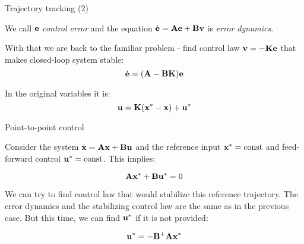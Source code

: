 \documentclass{beamer}
\begin{document}
\begin{frame}{Trajectory tracking (2)}
	\begin{flushleft}
		
		We call $\mathbf{e}$ \emph{control error} and the equation $\dot{\mathbf{e}} = \mathbf{A}\mathbf{e} + \mathbf{B}\mathbf{v}$ is \emph{error dynamics}.
		
		\bigskip
		
		With that we are back to the familiar problem - find control law $\mathbf{v} = -\mathbf{K}\mathbf{e}$ that makes closed-loop system stable:
		\begin{equation}
			\dot{\mathbf{e}} = (\mathbf{A} - \mathbf{B}\mathbf{K}) \mathbf{e}
		\end{equation}
		
		In the original variables it is:
		\begin{equation}
			\mathbf{u} = \mathbf{K}(\mathbf{x}^* - \mathbf{x}) + \mathbf{u}^*
		\end{equation}
		
	\end{flushleft}
\end{frame}




\begin{frame}{Point-to-point control}
	\begin{flushleft}
		
		Consider the system $\dot{\mathbf{x}} = \mathbf{A}\mathbf{x} + \mathbf{B}\mathbf{u}$ and the reference input $\mathbf{x}^* = \text{const}$ and feed-forward control $\mathbf{u}^*= \text{const}$. This implies:
		
		\begin{equation}
			\mathbf{A}\mathbf{x}^* + \mathbf{B}\mathbf{u}^* = 0
		\end{equation}		
		
		We can try to find control law that would stabilize this reference trajectory. The error dynamics and the stabilizing control law are the same as in the previous case. But this time, we can find $\mathbf{u}^*$ if it is not provided:
		
		\begin{equation}
			 \mathbf{u}^* = -\mathbf{B}^+\mathbf{A}\mathbf{x}^*
		\end{equation}				
		
	\end{flushleft}
\end{frame}
\end{document}
